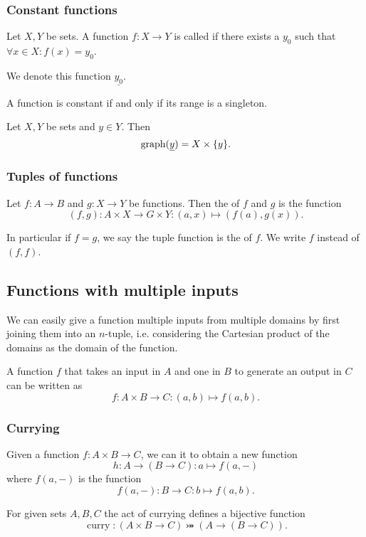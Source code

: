 \subsubsection{Constant functions}
\begin{definition}
Let $X,Y$ be sets. A function $f:X\to Y$ is called  if there exists a $y_0$ such that $\forall x\in X: f(x) = y_0$.

We denote this function $\underline{y_0}$.
\end{definition}

A function is constant if and only if its range is a singleton.

\begin{lemma}
Let $X,Y$ be sets and $y\in Y$. Then
\[ \operatorname{graph}(\underline{y}) = X\times \{y\}. \]
\end{lemma}

\subsubsection{Tuples of functions}
\begin{definition}
Let $f: A\to B$ and $g: X\to Y$ be functions. Then the  of $f$ and $g$ is the function
\[ (f,g): A\times X \to G\times Y: (a,x) \mapsto (f(a), g(x)). \]

In particular if $f=g$, we say the tuple function is the  of $f$. We write $f$ instead of $(f,f)$.
\end{definition}

\subsection{Functions with multiple inputs}
We can easily give a function multiple inputs from multiple domains by first joining them into an $n$-tuple, i.e. considering the Cartesian product of the domains as the domain of the function.

\begin{example}
A function $f$ that takes an input in $A$ and one in $B$ to generate an output in $C$ can be written as
\[ f: A\times B \to C: (a,b)\mapsto f(a,b). \]
\end{example}

\subsubsection{Currying}
\begin{definition}
Given a function $f: A\times B \to C$, we can  it to obtain a new function
\[ h: A \to (B\to C): a\mapsto f(a,-) \]
where $f(a,-)$ is the function
\[ f(a,-): B \to C: b\mapsto f(a,b). \]
\end{definition}
\begin{lemma}
For given sets $A,B,C$ the act of currying defines a bijective function
\[ \operatorname{curry}: (A\times B \to C) \twoheadrightarrowtail (A \to (B\to C)). \]
\end{lemma}

